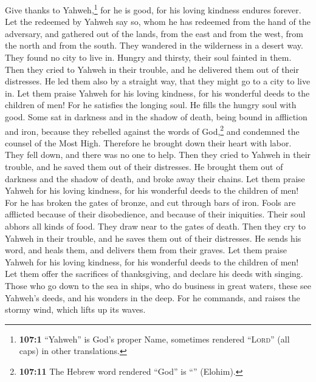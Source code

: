  Give thanks to Yahweh,\footnote{\textbf{107:1} ``Yahweh''
  is God's proper Name, sometimes rendered ``\textsc{Lord}'' (all caps)
  in other translations.} for he is good, for his loving kindness
endures forever.  Let the redeemed by Yahweh say so, whom
he has redeemed from the hand of the adversary,  and
gathered out of the lands, from the east and from the west, from the
north and from the south.  They wandered in the wilderness
in a desert way. They found no city to live in.  Hungry
and thirsty, their soul fainted in them.  Then they cried
to Yahweh in their trouble, and he delivered them out of their
distresses.  He led them also by a straight way, that they
might go to a city to live in.  Let them praise Yahweh for
his loving kindness, for his wonderful deeds to the children of men!
 For he satisfies the longing soul. He fills the hungry
soul with good.  Some sat in darkness and in the shadow
of death, being bound in affliction and iron,  because
they rebelled against the words of God,\footnote{\textbf{107:11} The
  Hebrew word rendered ``God'' is ``'' (Elohim).} and
condemned the counsel of the Most High.  Therefore he
brought down their heart with labor. They fell down, and there was no
one to help.  Then they cried to Yahweh in their trouble,
and he saved them out of their distresses.  He brought
them out of darkness and the shadow of death, and broke away their
chains.  Let them praise Yahweh for his loving kindness,
for his wonderful deeds to the children of men!  For he
has broken the gates of bronze, and cut through bars of iron.
 Fools are afflicted because of their disobedience, and
because of their iniquities.  Their soul abhors all kinds
of food. They draw near to the gates of death.  Then they
cry to Yahweh in their trouble, and he saves them out of their
distresses.  He sends his word, and heals them, and
delivers them from their graves.  Let them praise Yahweh
for his loving kindness, for his wonderful deeds to the children of men!
 Let them offer the sacrifices of thanksgiving, and
declare his deeds with singing.  Those who go down to the
sea in ships, who do business in great waters,  these see
Yahweh's deeds, and his wonders in the deep.  For he
commands, and raises the stormy wind, which lifts up its waves.
